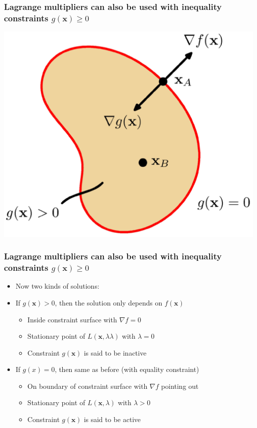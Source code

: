 \documentclass[12pt,notes,mathserif]{beamer}
\begin{document}
\begin{frame}[c]
\frametitle{Lagrange multipliers can also be used with inequality constraints $g(\mathbf{x})\geqslant{}0$}
\begin{center}
\includegraphics[width=0.65\linewidth]{fig8/lec832.jpg}
\end{center}
\end{frame}


\begin{frame}[c]
\frametitle{Lagrange multipliers can also be used with inequality constraints $g(\mathbf{x})\geqslant{}0$}
\begin{itemize}
\item Now two kinds of solutions:
\item If $g(\mathbf{x})> 0$, then the solution only depends on $f(\mathbf{x})$
\begin{itemize}
\item Inside constraint surface with $\nabla f= 0$
\item Stationary point of $L(\mathbf{x},𝜆\lambda)$ with $\lambda= 0$
\item Constraint $g(\mathbf{x})$ is said to be inactive
\end{itemize}
\item If $g(x)= 0$, then same as before (with equality constraint)
\begin{itemize}
\item On boundary of constraint surface with $\nabla f$ pointing out
\item Stationary point of $L(\mathbf{x},\lambda)$ with $\lambda> 0$
\item Constraint $g(\mathbf{x})$ is said to be active
\end{itemize}

\end{itemize}
\end{frame}
\end{document}
